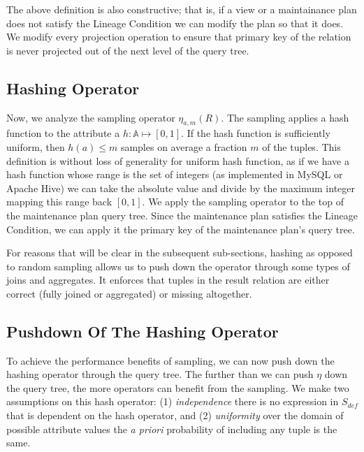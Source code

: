 The above definition is also constructive; that is, if a view or a maintainance plan does not satisfy the Lineage Condition we can modify the plan so that it does.
We modify every projection operation to ensure that primary key of the relation is never projected out of the next level of the query tree.

\subsection{Hashing Operator}
Now, we analyze the sampling operator $\eta_{a, m}(R)$. 
The sampling applies a hash function to the attribute a $h:\mathbb{A} \mapsto [0,1]$.
If the hash function is sufficiently uniform, then $h(a) \le m$ samples on average a fraction $m$ of the tuples.
This definition is without loss of generality for uniform hash function, as if we have a hash function whose range is the set of integers (as implemented in MySQL or Apache Hive) we can take the absolute value and divide by the maximum integer mapping this range back $[0,1]$.
We apply the sampling operator to the top of the maintenance plan query tree.
Since the maintenance plan satisfies the Lineage Condition, we can apply it the primary key of the maintenance plan's query tree.

For reasons that will be clear in the subsequent sub-sections, hashing as opposed to random sampling allows us to push down the operator through some types of joins and aggregates. 
It enforces that tuples in the result relation are either correct (fully joined or aggregated) or missing altogether.

\subsection{Pushdown Of The Hashing Operator}
To achieve the performance benefits of sampling, we can now push down the hashing operator through the query tree.
The further than we can push $\eta$ down the query tree, the more operators can benefit from the sampling.
We make two assumptions on this hash operator: (1) \emph{independence} there is no expression in $S_{def}$ that is dependent on the hash operator, and (2) \emph{uniformity} over the domain of possible attribute values the \emph{a priori} probability of including any tuple is the same.

